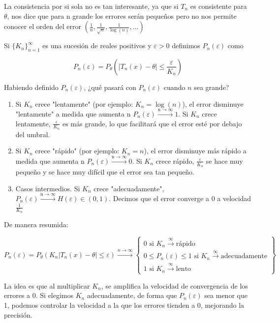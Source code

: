 La consistencia por si sola no es tan interesante, ya que si $T_n$ es consistente para $\theta$, nos dice que para n grande los errores serán pequeños pero no nos permite conocer el orden del error $\left(\frac{1}{n}, \frac{1}{\sqrt{n}},\frac{1}{\log(n)}, \dots\right)$

Si $\{K_n\}_{n=1}^{\infty}$ es una sucesión de reales positivos y $\varepsilon>0$ definimos $P_n(\varepsilon)$ como

\[P_n(\varepsilon)=P_\theta\left(|T_n(x)-\theta| \leq \frac{\varepsilon}{K_n}\right)\]

Habiendo definido $P_n(\varepsilon)$, ¿qué pasará con $P_n(\varepsilon)$ cuando $n$ sea grande?
\begin{enumerate}
    \item Si $K_n$ crece "lentamente" (por ejemplo:  $K_n=\log(n)$), el error disminuye "lentamente" a medida que aumenta n $P_n(\varepsilon) \xrightarrow{{\text{n} \to \infty}} 1$. Si $K_n$ crece lentamente, $ \frac{\varepsilon}{K_n}$ es más grande, lo que facilitará que el error esté por debajo del umbral.
    \item Si $K_n$ crece "rápido" (por ejemplo:  $K_n=n$), el error disminuye más rápido a medida que aumenta n $P_n(\varepsilon) \xrightarrow{{\text{n} \to \infty}} 0$.  Si $K_n$ crece rápido, $ \frac{\varepsilon}{K_n}$ se hace muy pequeño y se hace muy difícil que el error sea tan pequeño.
    \item Casos intermedios. Si $K_n$ crece "adecuadamente", $P_n(\varepsilon) \xrightarrow{{\text{n} \to \infty}} H(\varepsilon) \in (0,1)$. Decimos que el error converge a 0 a velocidad $\frac{1}{K_n}$
\end{enumerate}

De manera resumida:

\[
    P_n(\varepsilon) = P_\theta(K_n|T_n(x) - \theta| \leq \varepsilon) \xrightarrow{n \to \infty}\begin{Bmatrix}
        0 \text{ si } K_n \xrightarrow{\infty} \text{rápido}                                  \\
        0 \leq P_n(\varepsilon) \leq 1 \text{ si } K_n \xrightarrow{\infty} \text{adecuadamente} \\
        1 \text{ si } K_n \xrightarrow{\infty} \text{lento}
    \end{Bmatrix}
\]

La idea es que al multiplicar $K_n$, se amplifica la velocidad de convergencia de los errores a 0. Si elegimos $K_n$ adecuadamente, de forma que $P_n(\varepsilon)$ sea menor que 1, podemos controlar la velocidad a la que los errores tienden a 0, mejorando la precisión.

